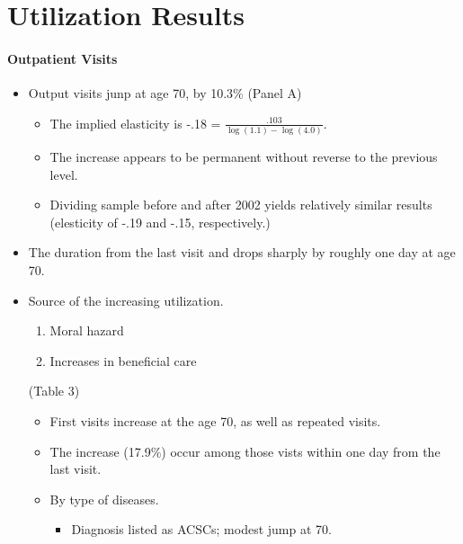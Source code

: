\documentclass[../root]{subfiles}
\begin{document}
    \section{Utilization Results}

    \paragraph{Outpatient Visits}

    \begin{itemize}
      \item Output visits junp at age 70, by 10.3\% (Panel A)
      \begin{itemize}
        \item The implied elasticity is -.18 = $\frac{.103}{\log(1.1) - \log(4.0)}$.
        \item The increase appears to be permanent without reverse to the previous level.
        \item Dividing sample before and after 2002 yields relatively similar results (elesticity of -.19 and -.15, respectively.)
      \end{itemize}
      \item The duration from the last visit and drops sharply by roughly one day at age 70.
      \item Source of the increasing utilization.
      \begin{enumerate}
        \item Moral hazard
        \item Increases in beneficial care
      \end{enumerate}
      (Table 3)
      \begin{itemize}
        \item First visits increase at the age 70, as well as repeated visits.
        \item The increase (17.9\%) occur among those vists within one day from the last visit.
        \item By type of diseases.
        \begin{itemize}
          \item Diagnosis listed as ACSCs; modest jump at 70.
        \end{itemize}
      \end{itemize}
    \end{itemize}
\end{document}
